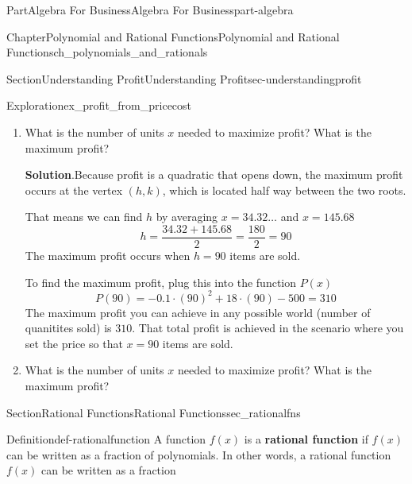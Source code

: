 \documentclass[oneside,10pt,]{tufte-book}
\newcommand{\blocktitlefont}{\relax}
\newcommand{\terminology}[1]{\textbf{#1}}
\numberwithin{equation}{chapter}
\begin{document}
\begin{partptx}{Part}{Algebra For Business}{}{Algebra For Business}{}{}{part-algebra}
\begin{chapterptx}{Chapter}{Polynomial and Rational Functions}{}{Polynomial and Rational Functions}{}{}{ch_polynomials_and_rationals}
\begin{sectionptx}{Section}{Understanding Profit}{}{Understanding Profit}{}{}{sec-understandingprofit}
\begin{exploration}{Exploration}{}{ex_profit_from_pricecost}
\begin{enumerate}[font=\bfseries,label=(\alph*),ref=\alph*]
You can solve this equation using the quadratic equation or by factoring.  This function does not have a nice factorization, so we use the quadratic equation%
\begin{equation*}
x = \dfrac{ -18 \pm \sqrt{18^2 - 4\cdot (-0.1)\cdot (-500)} }{2\cdot (-1)}
\end{equation*}
This gives us \(x=34.32\dots\) or \(x=145.68\)%
\item{}What is the number of units \(x\) needed to maximize profit?  What is the maximum profit?%
\par\smallskip%
\noindent\textbf{\blocktitlefont Solution}.\hypertarget{ex_profit_from_pricecost-6-2}{}\quad{}Because profit is a quadratic that opens down, the maximum profit occurs at the vertex \((h,k)\), which is located half way between the two roots.%
\par
That means we can find \(h\) by averaging  \(x=34.32\dots\) and \(x=145.68\)%
\begin{equation*}
h = \dfrac{34.32 + 145.68}{2} = \dfrac{180}{2} = 90
\end{equation*}
The maximum profit occurs when \(h=90\) items are sold.%
\par
To find the maximum profit, plug this into the function \(P(x)\)%
\begin{equation*}
P(90) = -0.1 \cdot  (90)^2 + 18\cdot (90) - 500 = 310
\end{equation*}
The maximum profit you can achieve in any possible world (number of quanitites sold) is \textdollar{}\(310\).  That total profit is achieved in the scenario where you set the price so that \(x=90\) items are sold.%
\item{}What is the number of units \(x\) needed to maximize profit?  What is the maximum profit?%
\end{enumerate}%
\end{exploration}%
\end{sectionptx}
%
%
\typeout{************************************************}
\typeout{************************************************}
%
\begin{sectionptx}{Section}{Rational Functions}{}{Rational Functions}{}{}{sec_rationalfns}
\begin{definition}{Definition}{}{def-rationalfunction}%
A function \(f(x)\) is a \terminology{rational function} if \(f(x)\) can be written as a fraction of polynomials. In other words, a rational function \(f(x)\) can be written as a fraction%
\begin{equation*}

\end{equation*}
\end{definition}
\end{sectionptx}
\end{chapterptx}
\end{partptx}
\end{document}
